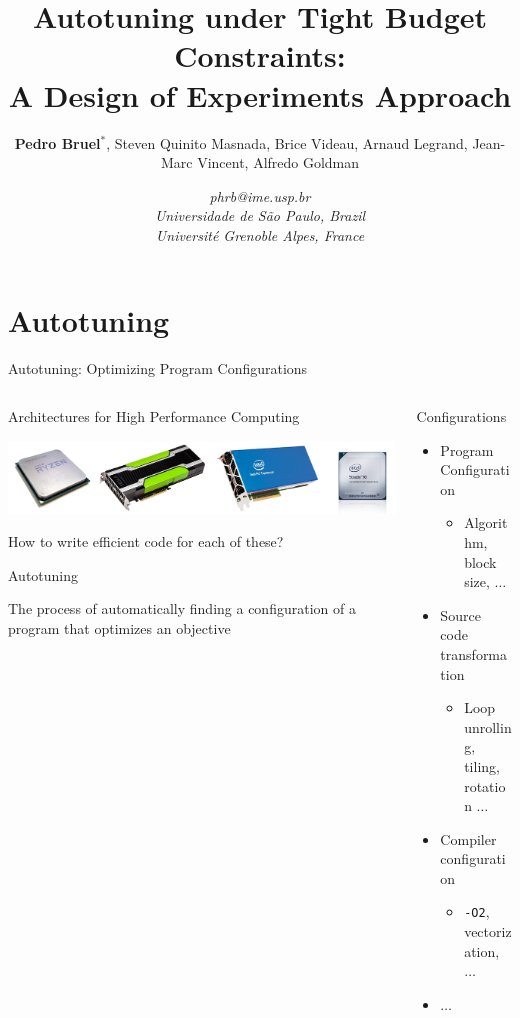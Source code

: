\documentclass[10pt, compress, aspectratio=169, xcolor={table,usenames,dvipsnames}]{beamer}
\author{ \footnotesize \textbf{\alert{Pedro Bruel$^{*}$}},  Steven Quinito Masnada, Brice Videau, Arnaud Legrand, Jean-Marc Vincent, Alfredo Goldman}
\date{ \scriptsize \textit{phrb@ime.usp.br} \\[1em] \textit{Universidade de São Paulo, Brazil} \\ \textit{Université Grenoble Alpes, France}}
\title{Autotuning under Tight Budget Constraints:  \\ A Design of Experiments Approach}
\begin{document}
\maketitle

\section{Autotuning}
\label{sec:orgb96fffa}
\begin{frame}[label={sec:orgb8420f0},fragile]{Autotuning: Optimizing Program Configurations}
 \begin{columns}
\begin{column}{0.5\columnwidth}
\begin{block}{Architectures for High Performance Computing}
\begin{center}
\includegraphics[width=.9\linewidth]{../../../img/architectures.png}
\end{center}

How to write \alert{efficient code} for each of these?

\begin{block}{Autotuning}
\vspace{.2cm}

The process of \alert{automatically finding} a \alert{configuration} of a program that
optimizes an \alert{objective}
\end{block}
\end{block}
\end{column}

\begin{column}{0.5\columnwidth}
\begin{block}{Configurations}
\begin{itemize}
\item Program Configuration
\begin{itemize}
\item Algorithm, block size, \(\dots\)
\end{itemize}
\item Source code transformation
\begin{itemize}
\item Loop unrolling, tiling, rotation \(\dots\)
\end{itemize}
\item Compiler configuration
\begin{itemize}
\item \texttt{-O2}, vectorization, \(\dots\)
\end{itemize}
\item \(\dots\)


\end{itemize}
\end{block}
\end{column}
\end{columns}
\end{frame}
\end{document}
